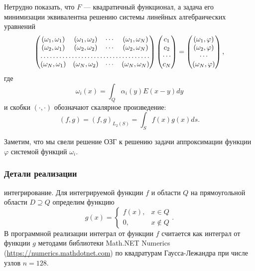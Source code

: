 \documentclass[a4paper, 12pt]{article}
\newcommand{\V}[1]{\int_Q #1(y) E(x-y) dy}
\begin{document}
Нетрудно показать, что $F$ --- квадратичный функционал, а задача его минимизации эквивалентна решению системы линейных алгебраических уравнений
\begin{equation}
    \begin{pmatrix}
        (\omega_1, \omega_1) & (\omega_1, \omega_2) & \cdots & (\omega_1, \omega_N)\\
        (\omega_2, \omega_1) & (\omega_2, \omega_2) & \cdots & (\omega_2, \omega_N)\\
        \hdotsfor{4}\\
        (\omega_N, \omega_1) & (\omega_N, \omega_2) & \cdots & (\omega_N, \omega_N)\\
    \end{pmatrix}
    \begin{pmatrix}
        c_1\\
        c_2\\
        \cdots\\
        c_N\\
    \end{pmatrix}
    =
    \begin{pmatrix}
        (\omega_1,\varphi)\\
        (\omega_2,\varphi)\\
        \cdots\\
        (\omega_N,\varphi)\\
    \end{pmatrix},
    \label{gram}
\end{equation}
где 
\begin{equation}
    \omega_i(x)=\V{\alpha_i}
\end{equation}
и скобки $(\cdot,\cdot)$ обозначают скалярное произведение:
\begin{equation}
    (f,g)=(f,g)_{L_2(S)}=\int_S f(x)g(x) ds.
\end{equation}

Заметим, что мы свели решение ОЗГ к решению задачи аппроксимации функции $\varphi$ системой функций $\omega_i$. 

\subsubsection{Детали реализации}
{ интегрирование}. Для интегрируемой функции $f$ и области $Q$ на прямоугольной области $D \supseteq Q$ определим функцию
\begin{equation*}
  g(x)=
  \begin{cases}
    f(x), & x \in Q\\
    0, & x \not \in Q
  \end{cases}.
\end{equation*}
В программной реализации интеграл от функции $f$ считается как интеграл от функции $g$ методами библиотеки Math.NET Numerics (\url{https://numerics.mathdotnet.com})
по квадратурам Гаусса-Лежандра при числе узлов $n=128$.
\end{document}
